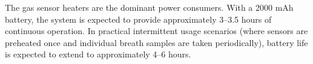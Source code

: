 The gas sensor heaters are the dominant power consumers. With a 2000 mAh battery, the system is expected to provide approximately 3--3.5 hours of continuous operation. In practical intermittent usage scenarios (where sensors are preheated once and individual breath samples are taken periodically), battery life is expected to extend to approximately 4--6 hours.

